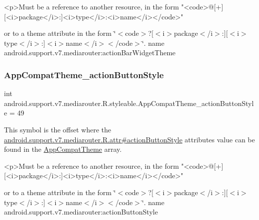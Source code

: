 \begin{DoxyVerb}      <p>Must be a reference to another resource, in the form "<code>@[+][<i>package</i>:]<i>type</i>:<i>name</i></code>"
\end{DoxyVerb}
 or to a theme attribute in the form \char`\"{}$<$code$>$?\mbox{[}$<$i$>$package$<$/i$>$\+:\mbox{]}\mbox{[}$<$i$>$type$<$/i$>$\+:\mbox{]}$<$i$>$name$<$/i$>$$<$/code$>$\char`\"{}.  name android.\+support.\+v7.\+mediarouter\+:action\+Bar\+Widget\+Theme \mbox{\label{classandroid_1_1support_1_1v7_1_1mediarouter_1_1R_1_1styleable_ac290db9607987bf254279ec5666c5b39}} 
\subsubsection{\texorpdfstring{App\+Compat\+Theme\+\_\+action\+Button\+Style}{AppCompatTheme\_actionButtonStyle}}
{\footnotesize\ttfamily int android.\+support.\+v7.\+mediarouter.\+R.\+styleable.\+App\+Compat\+Theme\+\_\+action\+Button\+Style = 49\hspace{0.3cm}{\ttfamily [static]}}

This symbol is the offset where the \hyperlink{classandroid_1_1support_1_1v7_1_1mediarouter_1_1R_1_1attr_a67f766676b702c3e5630424752ce1e20}{android.\+support.\+v7.\+mediarouter.\+R.\+attr\#action\+Button\+Style} attribute\textquotesingle{}s value can be found in the \hyperlink{classandroid_1_1support_1_1v7_1_1mediarouter_1_1R_1_1styleable_a4e3d3900c75d49aeb2f283cac00214d6}{App\+Compat\+Theme} array.

\begin{DoxyVerb}      <p>Must be a reference to another resource, in the form "<code>@[+][<i>package</i>:]<i>type</i>:<i>name</i></code>"
\end{DoxyVerb}
 or to a theme attribute in the form \char`\"{}$<$code$>$?\mbox{[}$<$i$>$package$<$/i$>$\+:\mbox{]}\mbox{[}$<$i$>$type$<$/i$>$\+:\mbox{]}$<$i$>$name$<$/i$>$$<$/code$>$\char`\"{}.  name android.\+support.\+v7.\+mediarouter\+:action\+Button\+Style \mbox{\label{classandroid_1_1support_1_1v7_1_1mediarouter_1_1R_1_1styleable_a39e9da7cc34bb8301e1380ffffd867bc}} 
